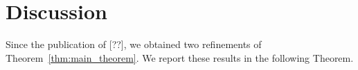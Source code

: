 \documentclass[twoside,11pt]{book}
\numberwithin{theorem}{chapter}
\numberwithin{definition}{chapter}
\numberwithin{proposition}{chapter}
\numberwithin{corollary}{chapter}
\numberwithin{example}{chapter}
\numberwithin{lemma}{chapter}
\numberwithin{assumption}{chapter}
\begin{document}









\section{Discussion}
\label{s:discussion}



Since the publication of [??], we obtained two refinements of Theorem~\ref{thm:main_theorem}. We report these results in the following Theorem.
\end{document}
